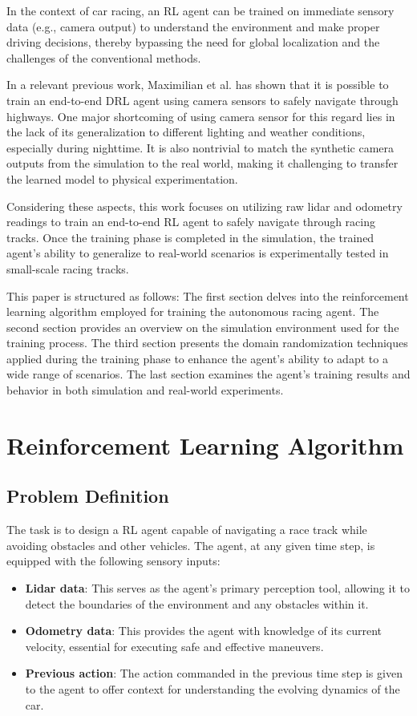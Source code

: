 \documentclass[a4paper, 10pt]{LTJournalArticle}
\begin{document}
In the context of car racing, an RL agent can be trained on immediate sensory data (e.g., camera output) to understand the environment and make proper driving decisions, thereby bypassing the need for global localization and the challenges of the conventional methods. 

In a relevant previous work, Maximilian et al.\autocite{Maximilian:2018} has shown that it is possible to train an end-to-end DRL agent using camera sensors to safely navigate through highways. One major shortcoming of using camera sensor for this regard lies in the lack of its generalization to different lighting and weather conditions, especially during nighttime. It is also nontrivial to match the synthetic camera outputs from the simulation to the real world, making it challenging to transfer the learned model to physical experimentation.

Considering these aspects, this work focuses on utilizing raw lidar and odometry readings to train an end-to-end RL agent to safely navigate through racing tracks. Once the training phase is completed in the simulation, the trained agent's ability to generalize to real-world scenarios is experimentally tested in small-scale racing tracks.

This paper is structured as follows: The first section delves into the reinforcement learning algorithm employed for training the autonomous racing agent. The second section provides an overview on the simulation environment used for the training process. The third section presents the domain randomization techniques applied during the training phase to enhance the agent's ability to adapt to a wide range of scenarios. The last section examines the agent's training results and behavior in both simulation and real-world experiments.


\section{Reinforcement Learning Algorithm}
\subsection{Problem Definition}
The task is to design a RL agent capable of navigating a race track while avoiding obstacles and other vehicles. The agent, at any given time step, is equipped with the following sensory inputs:
\begin{itemize}
    \item \textbf{Lidar data}: This serves as the agent's primary perception tool, allowing it to detect the boundaries of the environment and any obstacles within it.
    \item \textbf{Odometry data}: This provides the agent with knowledge of its current velocity, essential for executing safe and effective maneuvers.
    \item \textbf{Previous action}: The action commanded in the previous time step is given to the agent to offer context for understanding the evolving dynamics of the car.
\end{itemize}
\end{document}
